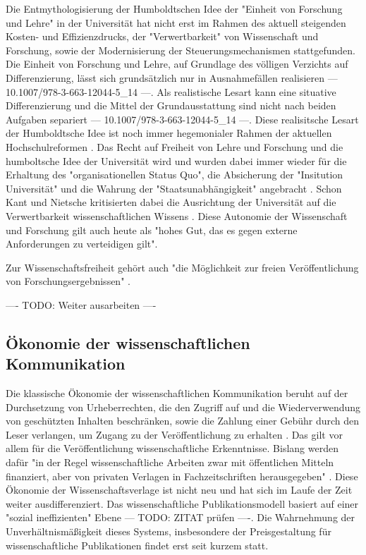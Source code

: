 Die Entmythologisierung der Humboldtschen Idee der "Einheit von Forschung und Lehre" in der Universität hat nicht erst im Rahmen des aktuell steigenden Kosten- und Effizienzdrucks, der "Verwertbarkeit" von Wissenschaft und Forschung, sowie der Modernisierung der Steuerungsmechanismen stattgefunden. Die Einheit von Forschung und Lehre, auf Grundlage des völligen Verzichts auf Differenzierung, lässt sich grundsätzlich nur in Ausnahmefällen realisieren  --- 10.1007/978-3-663-12044-5_14 ---. Als realistische Lesart kann eine situative Differenzierung und die Mittel der Grundausstattung sind nicht nach beiden Aufgaben separiert --- 10.1007/978-3-663-12044-5_14 ---. Diese realisitsche Lesart der Humboldtsche Idee ist noch immer hegemonialer Rahmen der aktuellen Hochschulreformen \cite{Huber_2005}. Das Recht auf Freiheit von Lehre und Forschung und die humboltsche Idee der Universität wird und wurden dabei immer wieder für die Erhaltung des "organisationellen Status Quo", die Absicherung der "Insitution Universität" und die Wahrung der "Staatsunabhängigkeit" angebracht \cite{Huber_2005}. Schon Kant und Nietsche kritisierten dabei die Ausrichtung der Universität auf die Verwertbarkeit wissenschaftlichen Wissens \cite{Huber_2005}. Diese Autonomie der Wissenschaft und Forschung gilt auch heute als "hohes Gut, das es gegen externe Anforderungen zu verteidigen gilt"\cite{kaldewey_2010}.

Zur Wissenschaftsfreiheit gehört auch "die Möglichkeit zur freien Veröffentlichung von Forschungsergebnissen" \cite{Fangerau_2014}.

---- TODO: Weiter ausarbeiten ----


\subsection{Ökonomie der wissenschaftlichen Kommunikation}
Die klassische Ökonomie der wissenschaftlichen Kommunikation beruht auf der Durchsetzung von Urheberrechten, die den Zugriff auf und die Wiederverwendung von geschützten Inhalten beschränken, sowie die Zahlung einer Gebühr durch den Leser verlangen, um Zugang zu der Veröffentlichung zu erhalten \cite{CREATe_2014}. Das gilt vor allem für die Veröffentlichung wissenschaftliche Erkenntnisse. Bislang werden dafür "in der Regel wissenschaftliche Arbeiten zwar mit öffentlichen Mitteln finanziert, aber von privaten Verlagen in Fachzeitschriften herausgegeben" \cite{WD_bundestag_2009}. Diese Ökonomie der Wissenschaftsverlage ist nicht neu und hat sich im Laufe der Zeit weiter ausdifferenziert. Das wissenschaftliche Publikationsmodell basiert auf einer "sozial ineffizienten" Ebene \cite{mueller-langer_2010} --- TODO: ZITAT prüfen ----. Die Wahrnehmung der Unverhältnismäßigkeit dieses Systems, insbesondere der Preisgestaltung für wissenschaftliche Publikationen \cite{King_2008} findet erst seit kurzem statt\cite{CREATe_2014}. 


